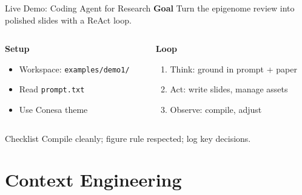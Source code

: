 \documentclass[aspectratio=169]{beamer}
\begin{document}
\begin{frame}{Live Demo: Coding Agent for Research}
  \textbf{Goal}\; Turn the epigenome review into polished slides with a ReAct loop.

  \vspace{0.5cm}
  \begin{columns}[T]
    \begin{column}{0.52\textwidth}
      \textbf{Setup}
      \begin{itemize}
        \item Workspace: \texttt{examples/demo1/}
        \item Read \texttt{prompt.txt}
        \item Use Conesa theme
      \end{itemize}
    \end{column}
    \begin{column}{0.44\textwidth}
      \textbf{Loop}
      \begin{enumerate}
        \item Think: ground in prompt + paper
        \item Act: write slides, manage assets
        \item Observe: compile, adjust
      \end{enumerate}
    \end{column}
  \end{columns}

  \begin{alertblock}{Checklist}
    Compile cleanly; figure rule respected; log key decisions.
  \end{alertblock}
\end{frame}

\section{Context Engineering}
\end{document}
